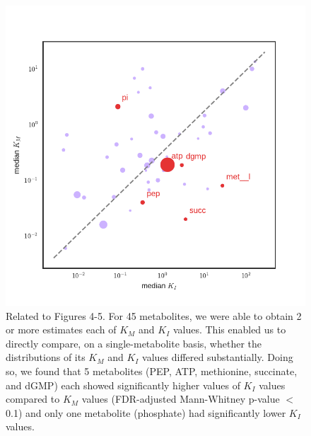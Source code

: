\documentclass[12pt,a4paper]{article}
\begin{document}
\begin{figure}[ht!]
	\includegraphics[width=\textwidth]{../manuscript/figS6.pdf}
	\caption{Related to Figures 4-5. For 45 metabolites, we were able to obtain 2 or more estimates each of $K_M$ and $K_I$ values. This enabled us to directly compare, on a single-metabolite basis, whether the distributions of its $K_M$ and $K_I$ values differed substantially. Doing so, we found that 5 metabolites (PEP, ATP, methionine, succinate, and dGMP) each showed significantly higher values of $K_I$ values compared to $K_M$ values (FDR-adjusted Mann-Whitney p-value $<$ 0.1) and only one metabolite (phosphate) had significantly lower $K_I$ values.
	}
\end{figure}

\end{document}
